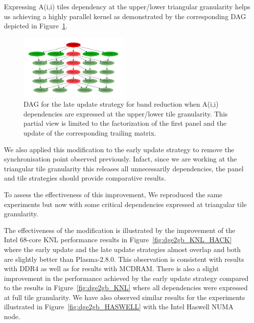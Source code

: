 Expressing A(i,i) tiles dependency at the upper/lower triangular
granularity helps us achieving a highly parallel kernel as
demonstrated by the corresponding DAG depicted in Figure~\ref{fig:dag_hack}.
\begin{figure}
  \begin{center}
    \includegraphics[width=0.48\textwidth]{fig/dag_better}
  \end{center}
  \caption{DAG for the late update strategy for band reduction when
      A(i,i) dependencies are expressed at the upper/lower tile
      granularity. This partial view is limited to the factorization of the
      first panel and the update of the corresponding trailing matrix.}
  \label{fig:dag_hack}
\end{figure}

We also applied this modification to the early update strategy
to remove the synchronisation point observed previously.
Infact, since we are working at the triangular tile granularity this
releases all unnecessarily dependencies,
the panel and tile strategies should provide comparative results.

To assess the effectiveness of this improvement,
We reproduced the same experiments but now with
some critical dependencies expressed at triangular
tile granularity.

The effectiveness of the modification is illustrated by
the improvement of the Intel 68-core KNL performance
results in Figure~\ref{fig:dge2gb_KNL_HACK} where
the early update and the late update strategies
almost overlap and both are slightly better than Plasma-2.8.0.
This observation is consistent with results with DDR4 as well as
for results with MCDRAM.
There is also a slight improvement in the
performance achieved by the early update strategy
compared to the results in Figure~\ref{fig:dge2gb_KNL} where all dependencies
were expressed at full tile granularity.
We have also observed similar results for the experiments
illustrated in Figure~\ref{fig:dge2gb_HASWELL} with the Intel Haswell NUMA node.


